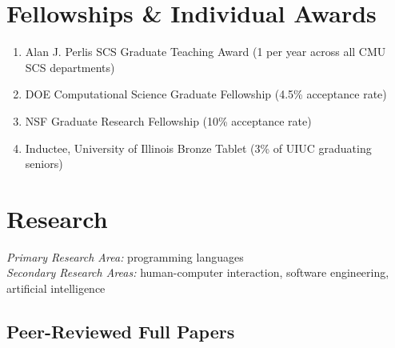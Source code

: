\documentclass[10pt,letterpaper]{article}
\begin{document}
  \section*{Fellowships \& Individual Awards}
\begin{enumerate}
  \item {Alan J. Perlis SCS Graduate Teaching Award} (1 per year across all CMU SCS departments)%
  \item DOE Computational Science Graduate Fellowship (4.5\% acceptance rate)
  \item NSF Graduate Research Fellowship (10\% acceptance rate)
  \item Inductee, University of Illinois Bronze Tablet (3\% of UIUC graduating seniors)
\end{enumerate}

\section*{Research}

\textit{Primary Research Area:} programming languages \\
\textit{Secondary Research Areas:} human-computer interaction, software engineering, artificial intelligence

\subsection*{Peer-Reviewed Full Papers}
\end{document}
